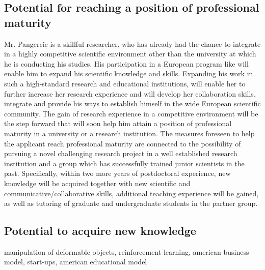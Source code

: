 \subsection{Potential for reaching a position of professional maturity}
Mr. Pangercic is a skillful researcher, who has already had the chance to integrate in a highly 
competitive scientific environment other than the university at which he is conducting his
studies.  His participation in a European program like \ksem will enable him to expand 
his scientific knowledge and skills. Expanding his work in such a high-standard research 
and educational institutions, will enable her to further increase her 
research experience and will develop her collaboration skills, integrate and  provide his 
ways to establish himself in the wide European scientific community. The gain of research 
experience in a competitive environment will be the step forward that will soon help him
attain a position of professional maturity in a university or a research institution. The 
measures foreseen to help the applicant reach professional maturity are connected to the 
possibility of pursuing a novel challenging research project in a well established research 
institution and a group which has successfully trained junior scientists in the past. 
Specifically, within two more years of postdoctoral experience, new knowledge will be 
acquired together with new scientific and communicative/collaborative skills, additional 
teaching experience will be gained, as well as tutoring of graduate and undergraduate 
students in the partner group. \\
\subsection{Potential to acquire new knowledge}
manipulation of deformable objects, reinforcement learning,  american business model, start-ups, 
american educational model\\

\newpage
